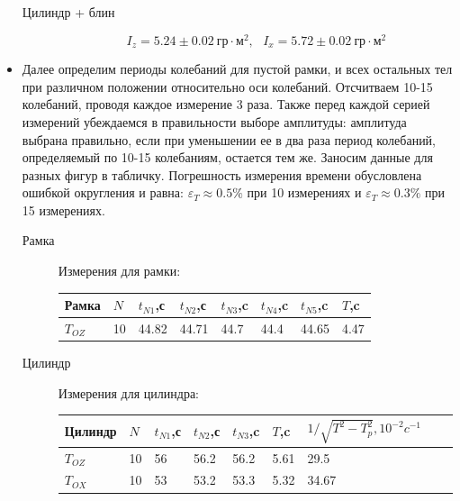 \documentclass[a4paper, 10pt]{article}%
\begin{document}
\begin{itemize}
\begin{description}
\item[Цилиндр + блин]
$$I_{z}= 5.24 \pm 0.02 \ \text{гр}\cdot \text{м}^2, \ \ \ I_{x}= 5.72 \pm 0.02 \ \text{гр}\cdot \text{м}^2$$
\end{description}


    \item Далее определим периоды колебаний для пустой рамки, и всех остальных тел при различном положении
относительно оси колебаний. Отсчитваем 10-15 колебаний, проводя каждое измерение 3 раза.
Также перед каждой серией измерений убеждаемся в правильности выборе амплитуды: амплитуда выбрана правильно, если при уменьшении ее
в два раза период колебаний, определяемый по 10-15 колебаниям, остается тем же. Заносим данные для разных фигур в табличку.
Погрешность измерения времени обусловлена ошибкой округления и равна: $\varepsilon_{T} \approx 0.5 \% $ при 10 измерениях и $\varepsilon_{T} \approx 0.3 \% $ при 15 измерениях.

\begin{description}
    \item[Рамка]Измерения для рамки: 
    \begin{table}[!ht]
        \centering
        \begin{tabular}{|l|l|l|l|l|l||l|l|} \hline
            Рамка & $N$ & $t_{N1}$,с & $t_{N2}$,с & $t_{N3}$,c & $t_{N4}$,c & $t_{N5}$,c & $T$,c \\ \hline
            $T_{OZ}$ & 10 & 44.82 & 44.71 & 44.7 & 44.4 & 44.65 & 4.47 \\ \hline
        \end{tabular}
    \end{table}
    \item[Цилиндр]Измерения для цилиндра:
    \begin{table}[!ht]
        \centering
        \begin{tabular}{|l|l|l|l|l|l|l||l|l|}
        \hline
            Цилиндр & $N$ & $t_{N1}$,с & $t_{N2}$,с & $t_{N3}$,c & $T$,c &
            $1/\sqrt{T^2-T^2_{p}}, 10^{-2} c^{-1}$  \\ \hline
            $T_{OZ}$ & 10 & 56 & 56.2 & 56.2 & 5.61 & 29.5  \\ \hline
            $T_{OX}$ & 10 & 53 & 53.2 & 53.3 & 5.32 & 34.67  \\ \hline
        \end{tabular}
    \end{table}


\end{description}
\end{itemize}
\end{document}
